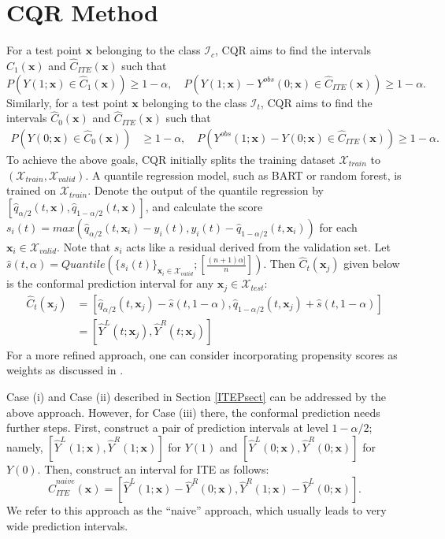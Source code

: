 \documentclass[11pt]{article}
\newcommand{\bx}{{\boldsymbol x}}
\begin{document}
\section{CQR Method} \label{CQR}

For a test point $\bx$ belonging to the class $\mathcal{I}_c$, 
CQR aims to find the intervals $\hat{C}_1(\bx)$ and $\hat{C}_{ITE}(\bx)$ such that
\[
P(Y(1;\bx) \in \hat{C}_1(\bx))\geq 1-\alpha, \quad 
P(Y(1;\bx)-Y^{obs}(0;\bx)\in \hat{C}_{ITE}(\bx)) \geq 1-\alpha.
\]
Similarly, for a test point $\bx$ belonging to the class 
$\mathcal{I}_t$, 
CQR aims to find the intervals $\hat{C}_0(\bx)$ and $\hat{C}_{ITE}(\bx)$ such that
\[
\begin{split}
P(Y(0;\bx) \in \hat{C}_0(\bx)) & \geq 1-\alpha, \quad 
P(Y^{obs}(1;\bx)-Y(0;\bx)\in \hat{C}_{ITE}(\bx)) \geq 1-\alpha.
\end{split}
\]
To achieve the above goals, CQR initially splits the training dataset $\mathcal{X}_{train}$ to $(\mathcal{X}_{train},\mathcal{X}_{valid})$. A quantile regression model, such as BART or random forest, is trained on $\mathcal{X}_{train}$. Denote the output of the quantile regression by  $[\hat{q}_{\alpha/2}(t,\bx),\hat{q}_{1-\alpha/2}(t,\bx)]$, and calculate the score $s_i(t)=max( \hat{q}_{\alpha/2}(t,\bx_i)-y_i(t), y_i(t)-\hat{q}_{1-\alpha/2}(t,\bx_i))$ for each $\bx_i\in \mathcal{X}_{valid}$. 
Note that $s_i$ acts like a residual derived from the validation set. Let $\hat{s}(t,\alpha)=Quantile(\{s_i(t)\}_{\bx_i\in \mathcal{X}_{valid}};[\frac{(n+1)\alpha ]}{n}])$. Then   $\hat{C}_t(\bx_j)$ given below is the conformal prediction interval  for any $\bx_j\in \mathcal{X}_{test}$: 
\[
\begin{split}
    \hat{C}_t(\bx_j)&=[\hat{q}_{\alpha/2}(t,\bx_j)-\hat{s}(t,1-\alpha),\hat{q}_{1-\alpha/2}(t,\bx_j)+\hat{s}(t,1-\alpha)] \\ %
        &=[\hat{Y}^L(t;\bx_j),\hat{Y}^R(t;\bx_j)] 
\end{split}
\] 
For a more refined approach, one can consider incorporating propensity scores as weights as discussed in \cite{Tib2019wconformal}.

Case (i) and Case (ii) described in Section \ref{ITEPsect} can be addressed by the above approach. However, for Case (iii) there, the conformal prediction needs further steps. First, construct a pair of prediction intervals at level $1-\alpha/2$; namely, $[\hat{Y}^L(1;\bx),\hat{Y}^R(1;\bx)]$ for $Y(1)$ and $[\hat{Y}^L(0;\bx),\hat{Y}^R(0;\bx)]$ for $Y(0)$.  Then, construct an interval for ITE as follows:
\[
\hat{C}^{naive}_{ITE}(\bx)=[\hat{Y}^L(1;\bx)-\hat{Y}^R(0;\bx), \hat{Y}^R(1;\bx) -\hat{Y}^L(0;\bx) ].
\]
We refer to this approach as the ``naive'' approach, which usually leads to very wide 
prediction intervals. 
\end{document}
